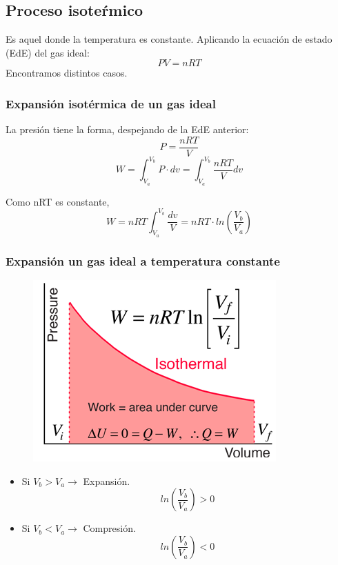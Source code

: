 \documentclass[12pt,twocolumn,a4paper]{report}
\begin{document}
\subsection*{Proceso isoteŕmico}
Es aquel donde la temperatura es constante. Aplicando la ecuación de estado (EdE) del gas ideal:
\begin{equation*}
PV = nRT
\end{equation*}
Encontramos distintos casos. 
\subsubsection*{Expansión isotérmica de un gas ideal}
La presión tiene la forma, despejando de la EdE anterior:
\begin{equation*}
P = \frac{nRT}{V}
\end{equation*}
\begin{equation*}
W= \int_{V_a}^{V_b} P \cdot dv = \int_{V_a}^{V_b} \frac{nRT}{V} dv
\end{equation*}

\vspace{15px}
Como nRT es constante, 
\vspace{1px}
\begin{equation*}
W= nRT\int_{V_a}^{V_b} \frac{dv}{V} = nRT \cdot ln\left(\frac{V_b}{V_a}\right)
\end{equation*}
\subsubsection*{Expansión un gas ideal a temperatura constante}
\begin{figure}[H]
\centering
\includegraphics[scale=3]{graficos/t3.png}
\end{figure}
\begin{itemize}
\setlength\itemsep{0.001cm}
\item{Si $V_b > V_a \rightarrow$ Expansión. 
\begin{equation*}
ln\left(\frac{V_b}{V_a}\right) > 0 
\end{equation*}
}
\item{Si $V_b < V_a \rightarrow$ Compresión. 
\begin{equation*}
ln\left(\frac{V_b}{V_a}\right) < 0 
\end{equation*}
}
\end{itemize}
\end{document}
